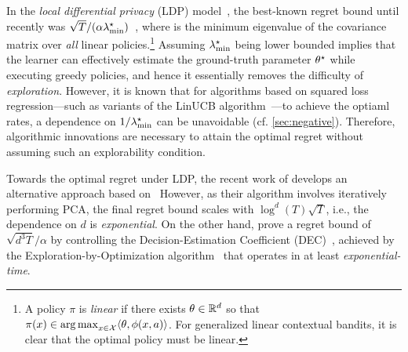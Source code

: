 \documentclass{article}
\newcommand{\arxiv}[1]{\iftoggle{colt}{}{#1}}
\newcommand{\colt}[1]{\iftoggle{colt}{#1}{}}
\begin{document}
In the \emph{local differential privacy} (LDP) model~\citep{duchi2013local}, the best-known regret bound until recently was $\sqrt{T}/(\alpha\lambda_{\min}^\star)$~\citep{han2021generalized}, where \colt{$\lmins\defeq \min_{\pi}\lmin(\EE^{\pi}\phxa\phxa\tp)$}\arxiv{
\begin{align*}
    \lmins\defeq \min_{\pi}\lmin(\EE^{\pi}\phxa\phxa\tp)
\end{align*}
} is the minimum eigenvalue of the covariance matrix over \emph{all} linear policies.\footnote{A policy $\pi$ is \emph{linear} if there exists $\theta\in\mathbb{R}^d$ so that $\pi(x)\in\operatorname*{arg\,max}_{x\in\mathcal{X}} \langle \theta, \phi(x,a)\rangle$. For generalized linear contextual bandits, it is clear that the optimal policy must be linear.}
Assuming $\lambda_{\min}^\star$ being lower bounded implies that the learner can effectively estimate the ground-truth parameter $\theta^\star$ while executing greedy policies, and hence 
it essentially removes the difficulty of \emph{exploration}. 
However, it is known that for algorithms based on squared loss regression---such as variants of the LinUCB algorithm~\citep{abbasi2011improved}---to achieve the optiaml rates, a dependence on $1/\lambda_{\min}^\star$ can be unavoidable (cf. \cref{sec:negative}). Therefore, algorithmic innovations are necessary to attain the optimal regret without assuming such an explorability condition.

Towards the optimal regret under LDP, the recent work of %
\citet{li2024optimal} develops an alternative approach based on~ %
However, as their algorithm involves iteratively performing PCA, the final regret bound scales with $\log^d(T)\sqrt{T}$, i.e., the dependence on $d$ is \emph{exponential}. 
On the other hand, \citet{chen2024private} prove a regret bound of $\sqrt{d^3T}/\alpha$ by controlling the Decision-Estimation Coefficient (DEC)~\citep{foster2021statistical,foster2023tight}, achieved by the Exploration-by-Optimization algorithm~\citep{lattimore2020exploration,foster2022complexity} that operates in at least \emph{exponential-time}.
\end{document}
